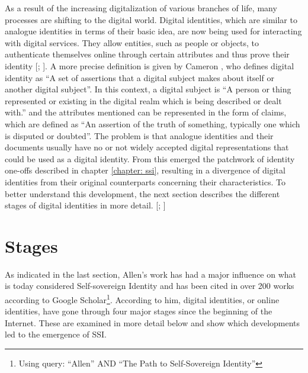     As a result of the increasing digitalization of various branches of life, many processes are shifting to the digital world. Digital identities, which are similar to analogue identities in terms of their basic idea, are now being used for interacting with digital services. They allow entities, such as people or objects, to authenticate themselves online through certain attributes and thus prove their identity [\citealp[p. 103]{meinel_blockchain_2020}; \citealp{bundesdruckerei_so_2020}]. A more precise definition is given by Cameron \cite{cameron_laws_2005}, who defines digital identity as “A set of assertions that a digital subject makes about itself or another digital subject”. In this context, a digital subject is “A person or thing represented or existing in the digital realm which is being described or dealt with.” and the attributes mentioned can be represented in the form of claims, which are defined as “An assertion of the truth of something, typically one which is disputed or doubted”. The problem is that analogue identities and their documents usually have no or not widely accepted \cite{krempl_e-government-studie_2019, koppenhofer_kabinettsbeschluss_2021} digital representations that could be used as a digital identity. From this emerged the patchwork of identity one-offs described in chapter \ref{chapter: ssi}, resulting in a divergence of digital identities from their original counterparts concerning their characteristics. To better understand this development, the next section describes the different stages of digital identities in more detail. [\citealp[p. 10]{struker_grundlagen_2021}; \citealp[p. 2]{ehrlich_self-sovereign_2021}]
    
	\section{Stages}
	
	As indicated in the last section, Allen's work \cite{allen_path_2016} has had a major influence on what is today considered Self-sovereign Identity and has been cited in over 200 works according to Google Scholar\footnote{Using query: “Allen” AND “The Path to Self-Sovereign Identity”}. According to him, digital identities, or online identities, have gone through four major stages since the beginning of the Internet. These are examined in more detail below and show which developments led to the emergence of \ac{SSI}.
	
